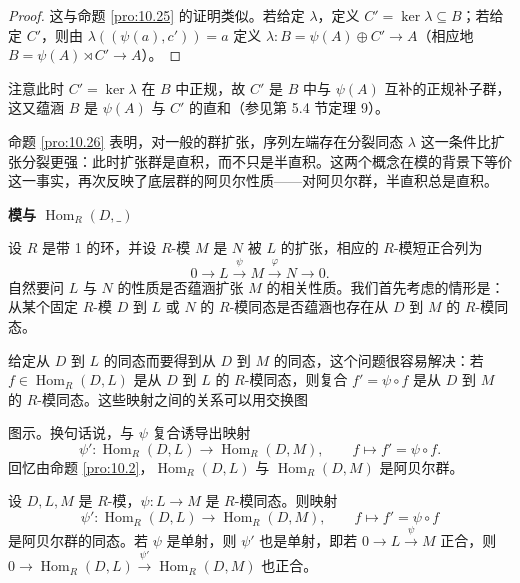 \begin{proof}
这与命题 \ref{pro:10.25} 的证明类似。若给定 \(\lambda\)，定义 \(C' = \ker\lambda \subseteq B\)；若给定 \(C'\)，则由 \(\lambda((\psi(a), c')) = a\) 定义 \(\lambda : B = \psi(A) \oplus C' \to A\)（相应地 \(B = \psi(A) \rtimes C' \to A\)）。
\end{proof}

注意此时 \(C' = \ker\lambda\) 在 \(B\) 中正规，故 \(C'\) 是 \(B\) 中与 \(\psi(A)\) 互补的正规补子群，这又蕴涵 \(B\) 是 \(\psi(A)\) 与 \(C'\) 的直和（参见第 5.4 节定理 9）。

命题 \ref{pro:10.26} 表明，对一般的群扩张，序列左端存在分裂同态 \(\lambda\) 这一条件比扩张分裂更强：此时扩张群是直积，而不只是半直积。这两个概念在模的背景下等价这一事实，再次反映了底层群的阿贝尔性质——对阿贝尔群，半直积总是直积。

\noindent\textbf{模与 \(\operatorname{Hom}_R(D, \_)\)}

设 \(R\) 是带 1 的环，并设 \(R\)-模 \(M\) 是 \(N\) 被 \(L\) 的扩张，相应的 \(R\)-模短正合列为
\[
0 \longrightarrow L \xrightarrow{\ \psi\ } M \xrightarrow{\ \varphi\ } N \longrightarrow 0.
\]
自然要问 \(L\) 与 \(N\) 的性质是否蕴涵扩张 \(M\) 的相关性质。我们首先考虑的情形是：从某个固定 \(R\)-模 \(D\) 到 \(L\) 或 \(N\) 的 \(R\)-模同态是否蕴涵也存在从 \(D\) 到 \(M\) 的 \(R\)-模同态。

给定从 \(D\) 到 \(L\) 的同态而要得到从 \(D\) 到 \(M\) 的同态，这个问题很容易解决：若 \(f \in \operatorname{Hom}_R(D, L)\) 是从 \(D\) 到 \(L\) 的 \(R\)-模同态，则复合 \(f' = \psi \circ f\) 是从 \(D\) 到 \(M\) 的 \(R\)-模同态。这些映射之间的关系可以用交换图
\begin{center}\end{center}
图示。换句话说，与 \(\psi\) 复合诱导出映射
\[
\psi' : \operatorname{Hom}_R(D, L) \to \operatorname{Hom}_R(D, M), \qquad f \mapsto f' = \psi \circ f.
\]
回忆由命题 \ref{pro:10.2}，\(\operatorname{Hom}_R(D, L)\) 与 \(\operatorname{Hom}_R(D, M)\) 是阿贝尔群。

\begin{proposition}\label{pro:10.27}
设 \(D, L, M\) 是 \(R\)-模，\(\psi : L \to M\) 是 \(R\)-模同态。则映射
\[
\psi' : \operatorname{Hom}_R(D, L) \to \operatorname{Hom}_R(D, M), \qquad f \mapsto f' = \psi \circ f
\]
是阿贝尔群的同态。若 \(\psi\) 是单射，则 \(\psi'\) 也是单射，即若 \(0 \to L \xrightarrow{\psi} M\) 正合，则 \(0 \to \operatorname{Hom}_R(D, L) \xrightarrow{\psi'} \operatorname{Hom}_R(D, M)\) 也正合。
\end{proposition}

